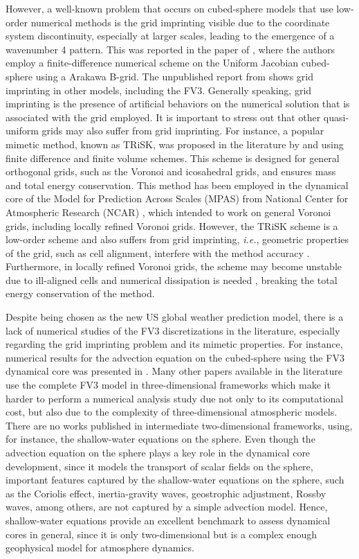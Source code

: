 However, a well-known problem that occurs on cubed-sphere models that use low-order numerical methods
is the grid imprinting visible due to the coordinate system discontinuity, 
especially at larger scales, leading to the emergence of a wavenumber 4 pattern.
This was reported in the paper of \citet{rancic:2017}, where the authors employ a 
finite-difference numerical scheme on the Uniform Jacobian cubed-sphere using a Arakawa B-grid.
The unpublished report from \citet{whitaker:2015} shows grid imprinting in other models, including 
the FV3.
Generally speaking, grid imprinting is the presence of artificial behaviors on 
the numerical solution that is associated with the grid employed.
It is important to stress out that other quasi-uniform grids may also suffer from grid imprinting.
For instance, a popular mimetic method, known as TRiSK, was proposed in the literature by
\citet{thuburn:2009} and \citet{ringler:2010} using finite difference and finite volume schemes.
This scheme is designed for general orthogonal grids, such as the Voronoi and icosahedral grids,
and ensures mass and total energy conservation.
This method has been employed in the dynamical core of the Model for Prediction Across Scales (MPAS)
from National Center for Atmospheric Research (NCAR) \citep{skamarock:12}, 
which intended to work on general Voronoi grids, including locally refined Voronoi grids.
However, the TRiSK scheme is a low-order scheme and also suffers from grid imprinting, \textit{i.e.},
geometric properties of the grid, such as cell alignment, interfere with the method accuracy
\citep{weller:12, peixoto:13, peixoto:16}. Furthermore, in locally refined Voronoi grids,
the scheme may become unstable due to ill-aligned cells and numerical dissipation is needed \citep{santos:2021},
breaking the total energy conservation of the method.

Despite being chosen as the new US global weather prediction model,
there is a lack of numerical studies of the FV3 discretizations in the literature,
especially regarding the grid imprinting problem and its mimetic properties.
For instance, numerical results for the advection equation on the cubed-sphere using the
FV3 dynamical core was presented in \citet{putman:2007}.
Many other papers available in the literature use the complete FV3 model in three-dimensional
frameworks which make it harder to perform a numerical analysis study due not only to its computational cost,
but also due to the complexity of three-dimensional atmospheric models.
There are no works published in intermediate two-dimensional frameworks, using, for 
instance, the shallow-water equations on the sphere.
Even though the advection equation on the sphere plays a key role in the dynamical core development,
since it models the transport of scalar fields on the sphere, important features captured by the shallow-water
equations on the sphere, such as the Coriolis effect, inertia-gravity waves, geostrophic adjustment, Rossby waves,
among others, are not captured by a simple advection model.
Hence, shallow-water equations provide an excellent benchmark to assess dynamical cores in general,
since it is only two-dimensional but is a complex enough geophysical model for atmosphere dynamics.

